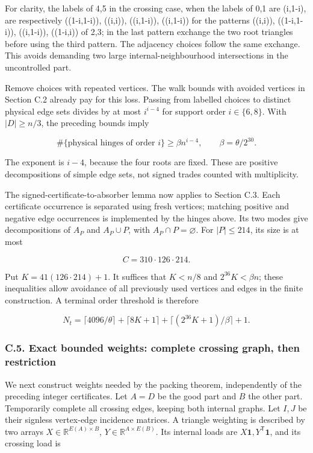 \documentclass[english,11pt,a4paper]{article}
\begin{document}
For clarity, the labels of 4,5 in the crossing case, when the labels of 0,1 are (i,1-i), are respectively ((1-i,1-i)), ((i,i)), ((i,1-i)), ((i,1-i)) for the patterns ((i,i)), ((1-i,1-i)), ((i,1-i)), ((1-i,i)) of 2,3; in the last pattern exchange the two root triangles before using the third pattern. The adjacency choices follow the same exchange. This avoids demanding two large internal-neighbourhood intersections in the uncontrolled part.

Remove choices with repeated vertices. The walk bounds with avoided vertices in Section C.2 already pay for this loss. Passing from labelled choices to distinct physical edge sets divides by at most \(i^{i-4}\) for support order \(i\in\{6,8\}\). With \(|D|\ge n/3\), the preceding bounds imply

\[\#\{\text{physical hinges of order }i\}
\ge\beta n^{i-4},\qquad \beta=\theta/2^{30}.
\tag{C.4.1}\]

The exponent is \(i-4\), because the four roots are fixed. These are positive decompositions of simple edge sets, not signed trades counted with multiplicity.

The signed-certificate-to-absorber lemma now applies to Section C.3. Each certificate occurrence is separated using fresh vertices; matching positive and negative edge occurrences is implemented by the hinges above. Its two modes give decompositions of \(A_P\) and \(A_P\cup P\), with \(A_P\cap P=\varnothing\). For \(|P|\le214\), its size is at most

\[C=310\cdot126\cdot214.
\tag{C.4.2}\]

Put \(K=41(126\cdot214)+1\). It suffices that \(K<n/8\) and \(2^{36}K<\beta n\); these inequalities allow avoidance of all previously used vertices and edges in the finite construction. A terminal order threshold is therefore

\[N_t=\lceil4096/\theta\rceil+\lceil8K+1\rceil
+\lceil(2^{36}K+1)/\beta\rceil+1.
\tag{C.4.3}\]

\subsubsection{C.5. Exact bounded weights: complete crossing graph, then restriction}\label{c.5.-exact-bounded-weights-complete-crossing-graph-then-restriction}

We next construct weights needed by the packing theorem, independently of the preceding integer certificates. Let \(A=D\) be the good part and \(B\) the other part. Temporarily complete all crossing edges, keeping both internal graphs. Let \(I,J\) be their signless vertex-edge incidence matrices. A triangle weighting is described by two arrays \(X\in\mathbb R^{E(A)\times B}\), \(Y\in\mathbb R^{A\times E(B)}\). Its internal loads are \(X\mathbf1,Y^{\mathsf T}\mathbf1\), and its crossing load is
\end{document}
